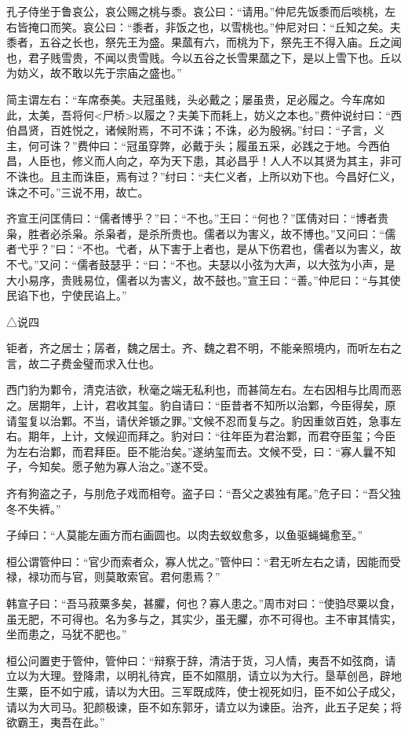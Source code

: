 \documentclass[]{article}
\begin{document}
孔子侍坐于鲁哀公，哀公赐之桃与黍。哀公曰：``请用。''仲尼先饭黍而后啖桃，左右皆掩口而笑。哀公曰：``黍者，非饭之也，以雪桃也。''仲尼对曰：``丘知之矣。夫黍者，五谷之长也，祭先王为盛。果蓏有六，而桃为下，祭先王不得入庙。丘之闻也，君子贱雪贵，不闻以贵雪贱。今以五谷之长雪果蓏之下，是以上雪下也。丘以为妨义，故不敢以先于宗庙之盛也。''

简主谓左右：``车席泰美。夫冠虽贱，头必戴之；屡虽贵，足必履之。今车席如此，太美，吾将何\textless{}尸桥\textgreater{}以履之？夫美下而耗上，妨义之本也。''费仲说纣曰：``西伯昌贤，百姓悦之，诸候附焉，不可不诛；不诛，必为殷祸。''纣曰：``子言，义主，何可诛？''费仲曰：``冠虽穿弊，必戴于头；履虽五采，必践之于地。今西伯昌，人臣也，修义而人向之，卒为天下患，其必昌乎！人人不以其贤为其主，非可不诛也。且主而诛臣，焉有过？''纣曰：``夫仁义者，上所以劝下也。今昌好仁义，诛之不可。''三说不用，故亡。

齐宣王问匡倩曰：``儒者博乎？''曰：``不也。''王曰：``何也？''匡倩对曰：``博者贵枭，胜者必杀枭。杀枭者，是杀所贵也。儒者以为害义，故不博也。''又问曰：``儒者弋乎？''曰：``不也。弋者，从下害于上者也，是从下伤君也，儒者以为害义，故不弋。''又问：``儒者鼓瑟乎：``曰：``不也。夫瑟以小弦为大声，以大弦为小声，是大小易序，贵贱易位，儒者以为害义，故不鼓也。''宣王曰：``善。''仲尼曰：``与其使民谄下也，宁使民谄上。''

△说四

钜者，齐之居士；孱者，魏之居士。齐、魏之君不明，不能亲照境内，而听左右之言，故二子费金璧而求入仕也。

西门豹为鄴令，清克洁欲，秋毫之端无私利也，而甚简左右。左右因相与比周而恶之。居期年，上计，君收其玺。豹自请曰：``臣昔者不知所以治鄴，今臣得矣，原请玺复以治鄴。不当，请伏斧锧之罪。''文候不忍而复与之。豹因重敛百姓，急事左右。期年，上计，文候迎而拜之。豹对曰：``往年臣为君治鄴，而君夺臣玺；今臣为左右治鄴，而君拜臣。臣不能治矣。''遂纳玺而去。文候不受，曰：``寡人曩不知子，今知矣。愿子勉为寡人治之。''遂不受。

齐有狗盗之子，与刖危子戏而相夸。盗子曰：``吾父之裘独有尾。''危子曰：``吾父独冬不失裤。''

子绰曰：``人莫能左画方而右画圆也。以肉去蚁蚁愈多，以鱼驱蝇蝇愈至。''

桓公谓管仲曰：``官少而索者众，寡人忧之。''管仲曰：``君无听左右之请，因能而受禄，禄功而与官，则莫敢索官。君何患焉？''

韩宣子曰：``吾马菽粟多矣，甚臞，何也？寡人患之。''周市对曰：``使驺尽粟以食，虽无肥，不可得也。名为多与之，其实少，虽无臞，亦不可得也。主不审其情实，坐而患之，马犹不肥也。''

桓公问置吏于管仲，管仲曰：``辩察于辞，清洁于货，习人情，夷吾不如弦商，请立以为大理。登降肃，以明礼待宾，臣不如隰朋，请立以为大行。垦草创邑，辟地生粟，臣不如宁戚，请以为大田。三军既成阵，使士视死如归，臣不如公子成父，请以为大司马。犯颜极谏，臣不如东郭牙，请立以为谏臣。治齐，此五子足矣；将欲霸王，夷吾在此。''
\end{document}
